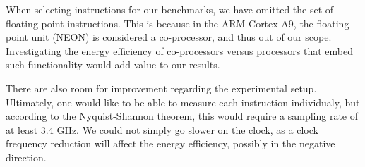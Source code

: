 When selecting instructions for our benchmarks, we have omitted the set of
floating-point instructions. This is because in the ARM Cortex-A9, the floating
point unit (NEON) is considered a co-processor\cite{armtech}, and thus out of
our scope. Investigating the energy efficiency of co-processors versus
processors that embed such functionality would add value to our results.

There are also room for improvement regarding the experimental setup. Ultimately,
one would like to be able to measure each instruction individualy, but according
to the Nyquist-Shannon theorem\cite{shannon1949communication}, this would
require a sampling rate of at least 3.4 GHz. We could not simply go slower on
the clock, as a clock frequency reduction will affect the energy
efficiency, possibly in the negative direction\cite{burd1995energy}.

